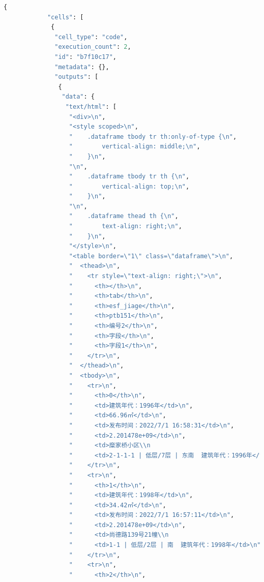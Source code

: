\documentclass[withoutpreface,bwprint]{cumcmthesis} %
\begin{document}
\begin{appendices}
    \begin{lstlisting}[language=Python]
        {
            "cells": [
             {
              "cell_type": "code",
              "execution_count": 2,
              "id": "b7f10c17",
              "metadata": {},
              "outputs": [
               {
                "data": {
                 "text/html": [
                  "<div>\n",
                  "<style scoped>\n",
                  "    .dataframe tbody tr th:only-of-type {\n",
                  "        vertical-align: middle;\n",
                  "    }\n",
                  "\n",
                  "    .dataframe tbody tr th {\n",
                  "        vertical-align: top;\n",
                  "    }\n",
                  "\n",
                  "    .dataframe thead th {\n",
                  "        text-align: right;\n",
                  "    }\n",
                  "</style>\n",
                  "<table border=\"1\" class=\"dataframe\">\n",
                  "  <thead>\n",
                  "    <tr style=\"text-align: right;\">\n",
                  "      <th></th>\n",
                  "      <th>tab</th>\n",
                  "      <th>esf_jiage</th>\n",
                  "      <th>ptb151</th>\n",
                  "      <th>编号2</th>\n",
                  "      <th>字段</th>\n",
                  "      <th>字段1</th>\n",
                  "    </tr>\n",
                  "  </thead>\n",
                  "  <tbody>\n",
                  "    <tr>\n",
                  "      <th>0</th>\n",
                  "      <td>建筑年代：1996年</td>\n",
                  "      <td>66.96㎡</td>\n",
                  "      <td>发布时间：2022/7/1 16:58:31</td>\n",
                  "      <td>2.201478e+09</td>\n",
                  "      <td>糜家桥小区\\n                                       ...</td>\n",
                  "      <td>2-1-1-1 | 低层/7层 | 东南  建筑年代：1996年</td>\n",
                  "    </tr>\n",
                  "    <tr>\n",
                  "      <th>1</th>\n",
                  "      <td>建筑年代：1998年</td>\n",
                  "      <td>34.42㎡</td>\n",
                  "      <td>发布时间：2022/7/1 16:57:11</td>\n",
                  "      <td>2.201478e+09</td>\n",
                  "      <td>尚德路139号21幢\\n                                  ...</td>\n",
                  "      <td>1-1 | 低层/2层 | 南  建筑年代：1998年</td>\n",
                  "    </tr>\n",
                  "    <tr>\n",
                  "      <th>2</th>\n",

\end{lstlisting}
\end{appendices}
\end{document}
